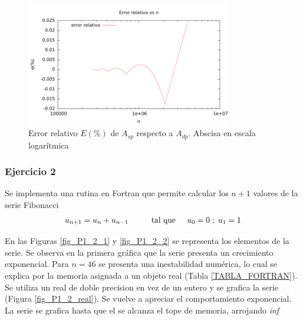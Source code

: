 \begin{figure} [H]
\begin{center}
\includegraphics[width=0.8\textwidth]{./parte2/graficos/grafico_p1_error.pdf}
\caption{Error relativo $E(\%)$ de $A_{sp}$ respecto a $A_{dp}$. Abscisa en escala logarítmica} \label{fig_P1_1_2}
\end{center}
\end{figure}


\subsubsection{Ejercicio 2}
Se implementa una rutina en Fortran que permite calcular los $n+1$ valores de la serie Fibonacci
\begin{equation}
u_{n+1} = u_{n} + u_{n-1} \hspace{1cm} \mbox{tal que} \hspace{0,5cm} u_0=0 \hspace{0,1cm} ; \hspace{0,1cm} u_1=1
\end{equation}

En las Figuras \ref{fig_P1_2_1} y \ref{fig_P1_2_2} se representa los elementos de la serie. Se observa en la primera gráfica que la serie presenta un crecimiento exponencial. Para $n=46$ se presenta una inestabilidad numérica, lo cual se explica por la memoria asignada a un objeto real (Tabla  \ref{TABLA_FORTRAN}). \\

Se utiliza un real de doble precision en vez de un entero y se grafica la serie (Figura \ref{fig_P1_2_real}). Se vuelve a apreciar el comportamiento exponencial. La serie se grafica hasta que el se alcanza el tope de memoria, arrojando \textit{inf}

